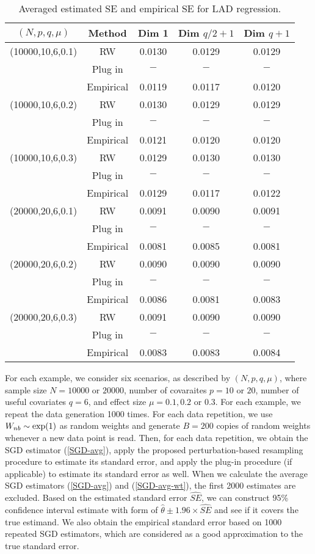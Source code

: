 \documentclass[12pt]{article}
\def\wh{\widehat}
\begin{document}
\begin{table}[!h]
	\centering
	\caption{Averaged estimated SE and empirical SE for LAD regression.}
	\medskip
	\label{tab:sim3-1}
	\begin{tabular}{ccccc}
		\hline
		$(N, p, q, \mu)$ & Method &Dim 1& Dim $q/2+1$ & Dim $q+1$\\
		\hline\hline
		(10000,10,6,0.1) & RW & 0.0130&  0.0129& 0.0129\\
		&Plug in & $-$& $-$& $-$\\
		&Empirical& 0.0119&  0.0117& 0.0120\\
		\hline
		(10000,10,6,0.2) &  RW & 0.0130&  0.0129& 0.0129\\
		&Plug in & $-$& $-$& $-$\\
		&Empirical& 0.0121&  0.0120& 0.0120\\
		\hline
		(10000,10,6,0.3) & RW & 0.0129&  0.0130& 0.0130\\
		&Plug in & $-$& $-$& $-$\\
		&Empirical& 0.0129&  0.0117& 0.0122\\
		\hline
		(20000,20,6,0.1) & RW & 0.0091&  0.0090& 0.0091\\
		&Plug in & $-$& $-$& $-$\\
		&Empirical& 0.0081&  0.0085& 0.0081\\
		\hline
		(20000,20,6,0.2)& RW & 0.0090&  0.0090& 0.0090\\
		&Plug in & $-$& $-$& $-$\\
		&Empirical& 0.0086& 0.0081 & 0.0083\\
		\hline
		(20000,20,6,0.3) & RW & 0.0091&  0.0090& 0.0090\\
		&Plug in & $-$& $-$& $-$\\
		&Empirical& 0.0083&  0.0083&  0.0084\\
		\hline
	\end{tabular}
\end{table}

For each example, we consider six scenarios, as described by $(N, p, q, \mu)$, where sample size $N=10000$ or $20000$, number of covaraites $p=10$ or $20$, number of useful covariates $q=6$, and effect size $\mu=0.1, 0.2$ or $0.3$. For each example, we repeat the data generation 1000 times. For each data repetition, we use $W_{nb}\sim{\rm exp}(1)$ as random weights and generate $B=200$ copies of random weights whenever a new data point is read. Then, for each data repetition, we obtain the SGD estimator (\ref{SGD-avg}), apply the proposed perturbation-based resampling procedure to estimate its standard error, and apply the plug-in procedure (if applicable) to estimate its standard error as well. When we calculate the average SGD estimators (\ref{SGD-avg}) and (\ref{SGD-avg-wt}), the first 2000 estimates are excluded. Based on the estimated standard error $\wh{SE}$, we can construct 95\% confidence interval estimate with form of $\wh{\theta} \pm 1.96 \times \wh{SE}$ and see if it covers the true estimand. We also obtain the empirical standard error based on 1000 repeated SGD estimators, which are considered as a good approximation to the true standard error.
\end{document}
